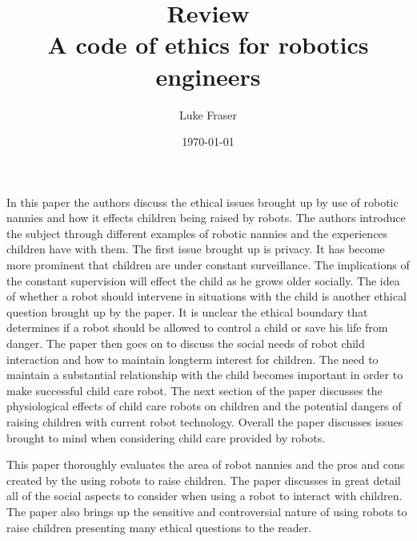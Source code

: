 \documentclass{article}
\begin{document}
\title{{\large Review} \\ A code of ethics for robotics engineers}
\author{Luke Fraser}
\date{\today}
\maketitle

\begingroup
\renewcommand{\section}[2]{}


\endgroup

\section*{Summary}
In this paper the authors discuss the ethical issues brought up by use of robotic nannies and how it effects children being raised by robots. The authors introduce the subject through different examples of robotic nannies and the experiences children have with them. The first issue brought up is privacy. It has become more prominent that children are under constant surveillance. The implications of the constant supervision will effect the child as he grows older socially. The idea of whether a robot should intervene in situations with the child is another ethical question brought up by the paper. It is unclear the ethical boundary that determines if a robot should be allowed to control a child or save his life from danger. The paper then goes on to discuss the social needs of robot child interaction and how to maintain longterm interest for children. The need to maintain a substantial relationship with the child becomes important in order to make successful child care robot. The next section of the paper discusses the physiological effects of child care robots on children and the potential dangers of raising children with current robot technology. Overall the paper discusses issues brought to mind when considering child care provided by robots.
\section*{Strengths}
This paper thoroughly evaluates the area of robot nannies and the pros and cons created by the using robots to raise children. The paper discusses in great detail all of the social aspects to consider when using a robot to interact with children. The paper also brings up the sensitive and controversial nature of using robots to raise children presenting many ethical questions to the reader.
\section*{Critique}

\cite{5453245}
\end{document}
